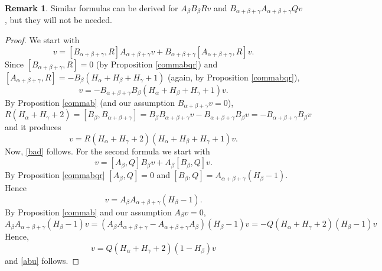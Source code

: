 \documentclass[twoside,a4paper,12pt]{article}
\theoremstyle{definition}
\newtheorem{remark}{Remark}
\begin{document}
\begin{remark}\label{othcom}
Similar formulas can be derived for $A_\beta B_\beta Rv$ and
	$B_{\alpha+\beta+\gamma}A_{\alpha+\beta+\gamma}Qv$, but they will not be
	needed.
\end{remark}

\begin{proof}
	We start with
	\begin{equation*}
		[B_{\alpha+\beta+\gamma}A_{\alpha+\beta+\gamma},R]v=
		[B_{\alpha+\beta+\gamma},R]A_{\alpha+\beta+\gamma}v
		+B_{\alpha+\beta+\gamma}[A_{\alpha+\beta+\gamma},R]v.
	\end{equation*}
	Since $[B_{\alpha+\beta+\gamma},R]=0$ (by Proposition \ref{commabqr}) and
	$[A_{\alpha+\beta+\gamma},R]=-B_\beta(H_\alpha+H_\beta+H_\gamma+1)$ (again,
	by Proposition \ref{commabqr}),
	\begin{equation*}
		[B_{\alpha+\beta+\gamma}A_{\alpha+\beta+\gamma},R]v=
		-B_{\alpha+\beta+\gamma}B_\beta(H_\alpha+H_\beta+H_\gamma+1)v.
	\end{equation*}
	By Proposition \ref{commab}
	(and our assumption $B_{\alpha+\beta+\gamma}v=0$),
	\begin{equation*}
		R(H_\alpha+H_\gamma+2)=[B_\beta,B_{\alpha+\beta+\gamma}]=
		B_\beta B_{\alpha+\beta+\gamma}v-B_{\alpha+\beta+\gamma}B_\beta v=
		-B_{\alpha+\beta+\gamma}B_\beta v
	\end{equation*}
	and it produces
	\begin{equation*}
		[B_{\alpha+\beta+\gamma}A_{\alpha+\beta+\gamma},R]v=
		R(H_\alpha+H_\gamma+2)(H_\alpha+H_\beta+H_\gamma+1)v.
	\end{equation*}
	Now, \eqref{bad} follows. For the second formula we start with
	\begin{equation*}
		[A_\beta B_\beta,Q]v=[A_\beta,Q]B_\beta v+A_\beta[B_\beta,Q]v.
	\end{equation*}
	By Proposition \ref{commabqr} $[A_\beta,Q]=0$ and
	$[B_\beta,Q]=A_{\alpha+\beta+\gamma}(H_\beta-1)$. Hence
	\begin{equation*}
		[A_\beta B_\beta,Q]v=A_\beta A_{\alpha+\beta+\gamma}(H_\beta-1).
	\end{equation*}
	By Proposition \ref{commab} and our assumption $A_\beta v=0$,
	\begin{equation*}
		A_\beta A_{\alpha+\beta+\gamma}(H_\beta-1)v=
		(A_\beta A_{\alpha+\beta+\gamma}-A_{\alpha+\beta+\gamma}A_\beta)
		(H_\beta-1)v=-Q(H_\alpha+H_\gamma+2)(H_\beta-1)v
	\end{equation*}
	Hence,
	\begin{equation*}
		[A_\beta B_\beta,Q]v=Q(H_\alpha+H_\gamma+2)(1-H_\beta)v
	\end{equation*}
	and \eqref{abu} follows.
\end{proof}
\end{document}
